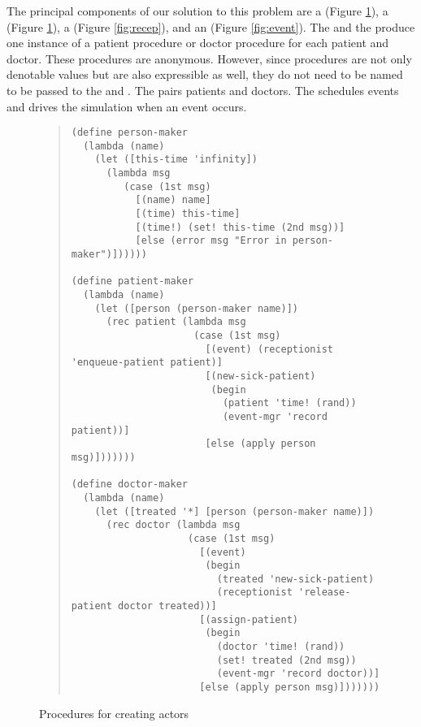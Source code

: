 The principal components of our solution to this problem are a
 (Figure \ref{fig:actor-maker}), a 
(Figure \ref{fig:actor-maker}), a  (Figure \ref{fig:recep}),
and an  (Figure \ref{fig:event}). The
 and the  produce one instance
of a patient procedure or doctor procedure for each patient and
doctor.  These procedures are anonymous.  However, since procedures are
not only denotable values but are also expressible as well, they do not
need to be named to be passed to the  and
.  The  pairs patients and
doctors.  The  schedules events and drives the
simulation when an event occurs.
\begin{figure}
\begin{frameit}
\begin{quote}
\begin{verbatim}
(define person-maker
  (lambda (name)
    (let ([this-time 'infinity])
      (lambda msg
         (case (1st msg)
           [(name) name]
           [(time) this-time]
           [(time!) (set! this-time (2nd msg))]
           [else (error msg "Error in person-maker")])))))

(define patient-maker
  (lambda (name)
    (let ([person (person-maker name)])
      (rec patient (lambda msg
                     (case (1st msg)
                       [(event) (receptionist 'enqueue-patient patient)]
                       [(new-sick-patient)
                        (begin
                          (patient 'time! (rand))
                          (event-mgr 'record patient))]
                       [else (apply person msg)]))))))

(define doctor-maker
  (lambda (name)
    (let ([treated '*] [person (person-maker name)])
      (rec doctor (lambda msg
                    (case (1st msg)
                      [(event)
                       (begin
                         (treated 'new-sick-patient)
                         (receptionist 'release-patient doctor treated))]
                      [(assign-patient)
                       (begin
                         (doctor 'time! (rand))
                         (set! treated (2nd msg))
                         (event-mgr 'record doctor))]
                      [else (apply person msg)]))))))

\end{verbatim}
\end{quote}
\caption{Procedures for creating actors}
\label{fig:actor-maker}
\end{frameit}
\end{figure}
